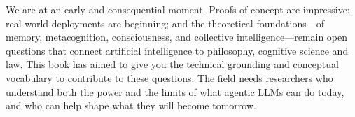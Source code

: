 We are at an early and consequential moment. Proofs of concept are 
impressive; real-world deployments are beginning; and the theoretical 
foundations---of memory, metacognition, consciousness, and collective 
intelligence---remain open questions that connect artificial intelligence to 
philosophy, cognitive science and law. This book has aimed to give you the 
technical grounding and conceptual vocabulary to contribute to these 
questions. The field needs researchers who understand both the power and the 
limits of what agentic LLMs can do today, and who can help shape what they 
will become tomorrow.

